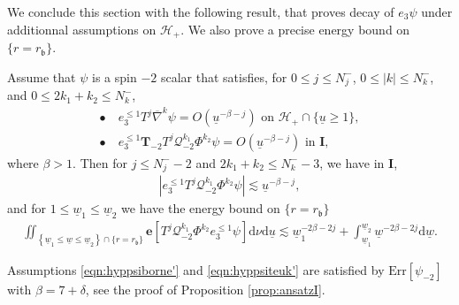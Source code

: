 \documentclass[reqno]{amsart}
\numberwithin{equation}{section}
\newcommand{\mch}{\mathcal{H}}
\newcommand{\mcq}{\mathcal{Q}}
\newcommand{\wbar}{\underline{w}}
\newcommand{\ubar}{{\underline{u}}}
\newcommand{\errm}{\mathrm{Err}[\Psim]}
\newcommand{\carterm}{\mcq_{-2}}
\newcommand{\nablabar}{\overline{\nabla}}
\newcommand{\dee}{\mathrm{d}}
\newcommand{\teuk}{\mathbf{T}}
\newcommand{\un}{\mathbf{I}}
\newcommand{\rb}{r_\mathfrak{b}}
\newcommand{\Psim}{\psi_{-2}}
\theoremstyle{plain}
\theoremstyle{definition}
\theoremstyle{remark}
\numberwithin{equation}{section}
\begin{document}
We conclude this section with the following result, that proves decay of $e_3\psi$ under additionnal assumptions on $\mch_+$. We also prove a precise energy bound on $\{r=\rb\}$. 
\begin{thm}\label{thm:psim} Assume that $\psi$ is a spin $-2$ scalar that satisfies, for $0\leq j\leq N_j^-$, $0\leq |k|\leq N_k^-$, and $0\leq 2k_1+k_2\leq N_k^-$,
\begin{align}
    \bullet\:&e_3^{\leq 1}T^j\nablabar^k\psi=O(\ubar^{-\beta-j})\text{   on   }\mch_+\cap\{\ubar\geq 1\},\label{eqn:hyppsiborne'}\\
    \bullet\:&e_3^{\leq 1}\teuk_{-2}T^j\mcq_{-2}^{k_1}\Phi^{k_2}\psi=O(\ubar^{-\beta-j})\text{   in   }\un,\label{eqn:hyppsiteuk'}
\end{align}
 where $\beta>1$. Then for $j\leq N_j^--2$ and $2k_1+k_2\leq N_k^--3$, we have in $\un$,
\begin{align}\label{eqn:provprov}
        |e_3^{\leq 1}T^j\carterm^{k_1}\Phi^{k_2}\psi|\lesssim\ubar^{-\beta-j},
    \end{align}
    and for $1\leq\wbar_1\leq\wbar_2$ we have the energy bound on $\{r=\rb\}$
    \begin{align}\label{eqn:enerprecise}
        \iint_{\left\{\underline{w}_1 \leq \underline{w} \leq \underline{w}_2\right\} \cap \{r=\rb\}} \mathbf{e}[T^j\carterm^{k_1}\Phi^{k_2}e_3^{\leq 1}\psi]\dee\nu\mathrm{d} \underline{u}\lesssim\wbar_1^{-2\beta-2j}+\int_{\underline{w}_1}^{\underline{w}_2} \underline{w}^{-2\beta-2j} \mathrm{d} \underline{w}.
    \end{align}
\end{thm}
\begin{rem}
    Assumptions \eqref{eqn:hyppsiborne'} and \eqref{eqn:hyppsiteuk'} are satisfied by $\errm$ with $\beta=7+\delta$, see the proof of Proposition \ref{prop:ansatzI}.
\end{rem}
\end{document}
